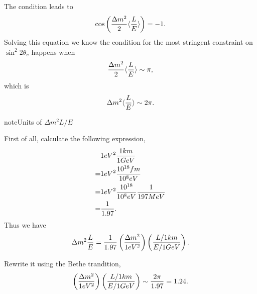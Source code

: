 \documentclass[letterpaper,12pt,english]{sphinxmanual}
\begin{document}
The condition leads to
\begin{gather}
\begin{split}\cos\left( \frac{\Delta m^2}{2} \langle \frac{L}{E} \rangle \right) = -1.\end{split}\notag
\end{gather}
Solving this equation we know the condition for the most stringent constraint on \(\sin^2 2\theta_v\) happens when
\begin{gather}
\begin{split}\frac{\Delta m^2}{2} \langle \frac{L}{E} \rangle \sim \pi,\end{split}\notag
\end{gather}
which is
\begin{gather}
\begin{split}\Delta m^2 \langle \frac{L}{E} \rangle \sim 2\pi.\end{split}\notag
\end{gather}
\begin{notice}{note}{Units of \(\Delta m^2  L/E\)}

First of all, calculate the following expression,
\begin{gather}
\begin{split}&1 eV^2 \frac{1km}{1GeV} \\
=& 1eV^2 \frac{10^{18}fm}{10^8 eV} \\
=& 1eV^2 \frac{10^{18}}{10^8 eV} \frac{1}{197 MeV} \\
=& \frac{1}{1.97}.\end{split}\notag
\end{gather}
Thus we have
\begin{gather}
\begin{split}\Delta m^2   \frac{L}{E} = \frac{1}{1.97} \left( \frac{\Delta m^2}{1eV^2} \right) \left(  \frac{L/1km}{E/1GeV} \right).\end{split}\notag
\end{gather}\end{notice}

Rewrite it using the Bethe trandition,
\begin{gather}
\begin{split}\left( \frac{\Delta m^2}{1eV^2} \right) \left(  \frac{L/1km}{E/1GeV} \right) \sim \frac{2\pi}{1.97} = 1.24.\end{split}\notag
\end{gather}
\end{document}

